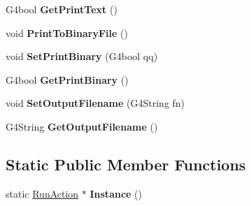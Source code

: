 \begin{DoxyCompactItemize}
G4bool {\bfseries Get\+Print\+Text} ()
\item 
\hypertarget{class_run_action_ab6388d8fbec4e93273a236f2830aa6cc}{}\label{class_run_action_ab6388d8fbec4e93273a236f2830aa6cc} 
void {\bfseries Print\+To\+Binary\+File} ()
\item 
\hypertarget{class_run_action_a2a9bdeba1acde5ff921344ca3e147def}{}\label{class_run_action_a2a9bdeba1acde5ff921344ca3e147def} 
void {\bfseries Set\+Print\+Binary} (G4bool qq)
\item 
\hypertarget{class_run_action_a6379bd2efaf18b0643bac93ae1fa0504}{}\label{class_run_action_a6379bd2efaf18b0643bac93ae1fa0504} 
G4bool {\bfseries Get\+Print\+Binary} ()
\item 
\hypertarget{class_run_action_ac1f1795ad1117913a94e226abbdbff07}{}\label{class_run_action_ac1f1795ad1117913a94e226abbdbff07} 
void {\bfseries Set\+Output\+Filename} (G4\+String fn)
\item 
\hypertarget{class_run_action_a43dd451e8b192a1b18c1c523d77c7257}{}\label{class_run_action_a43dd451e8b192a1b18c1c523d77c7257} 
G4\+String {\bfseries Get\+Output\+Filename} ()
\end{DoxyCompactItemize}
\subsection*{Static Public Member Functions}
\begin{DoxyCompactItemize}
\item 
\hypertarget{class_run_action_a9777cbd4dfdce2215863eb2a0388b4db}{}\label{class_run_action_a9777cbd4dfdce2215863eb2a0388b4db} 
static \hyperlink{class_run_action}{Run\+Action} $\ast$ {\bfseries Instance} ()
\end{DoxyCompactItemize}
